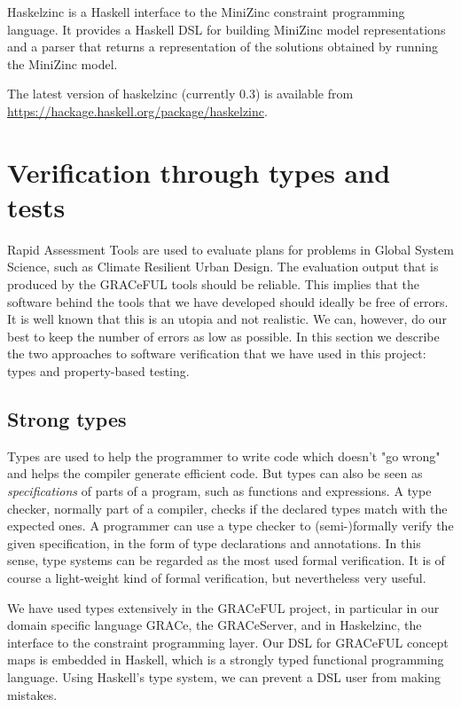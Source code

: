 \documentclass{article}
\begin{document}
Haskelzinc is a Haskell interface to the MiniZinc constraint
programming language.
%
It provides a Haskell DSL for building MiniZinc model representations and a parser that returns a representation of the solutions obtained
by running the MiniZinc model.

The latest version of haskelzinc (currently 0.3) is available from
\url{https://hackage.haskell.org/package/haskelzinc}.


\section{Verification through types and tests}
\label{sec:verification}

Rapid Assessment Tools are used to evaluate plans for problems in
Global System Science, such as Climate Resilient Urban Design.
%
The evaluation output that is produced by the GRACeFUL tools should be
reliable.
%
This implies that the software behind the tools that we have developed
should ideally be free of errors.
%
It is well known that this is an utopia and not realistic.
%
We can, however, do our best to keep the number of errors as low as
possible.
%
In this section we describe the two approaches to software
verification that we have used in this project: types and
property-based testing.

\subsection{Strong types}

Types are used to help the programmer to write code which doesn't "go
wrong" and helps the compiler generate efficient code.
%
But types can also be seen as \emph{specifications} of parts of a
program, such as functions and expressions.
%
A type checker, normally part of a compiler, checks if the declared
types match with the expected ones.
%
A programmer can use a type checker to (semi-)formally verify the
given specification, in the form of type declarations and
annotations.
%
In this sense, type systems can be regarded as the most used formal
verification.
%
It is of course a light-weight kind of formal verification, but
nevertheless very useful.

We have used types extensively in the GRACeFUL project, in particular
in our domain specific language GRACe, the GRACeServer, and in
Haskelzinc, the interface to the constraint programming layer.
%
Our DSL for GRACeFUL concept maps is embedded in Haskell, which is a
strongly typed functional programming language.
%
Using Haskell's type system, we can prevent a DSL user from making
mistakes.
\end{document}
